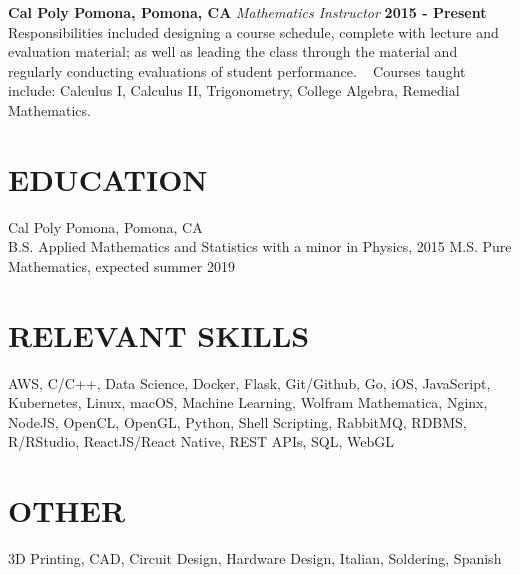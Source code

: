 \documentclass[margin]{./res}
\begin{document}
\begin{resume}
{\bf Cal Poly Pomona, Pomona, CA}\newline
{\it Mathematics Instructor}\newline
{\bf 2015 - Present}\newline
Responsibilities included designing a course schedule, complete with lecture and
evaluation material; as well as leading the class through the material and
regularly conducting evaluations of student performance.\newline
\ \newline
Courses taught include: Calculus I, Calculus II, Trigonometry, College Algebra,
Remedial Mathematics.

\section{EDUCATION}
Cal Poly Pomona, Pomona, CA \\
B.S. Applied Mathematics and Statistics with a minor in Physics, 2015 \newline
M.S. Pure Mathematics, expected summer 2019

\section{RELEVANT SKILLS}
AWS, C/C++, Data Science, Docker, Flask, 
Git/Github, Go, iOS, JavaScript, Kubernetes, Linux, macOS, Machine Learning, Wolfram Mathematica, 
Nginx, NodeJS, OpenCL, OpenGL, Python, Shell Scripting, RabbitMQ, RDBMS, R/RStudio,
ReactJS/React Native, REST APIs, SQL, WebGL
\section{OTHER}
3D Printing, CAD, Circuit Design,
Hardware Design, Italian, Soldering, Spanish
 
\end{resume}
\end{document}
